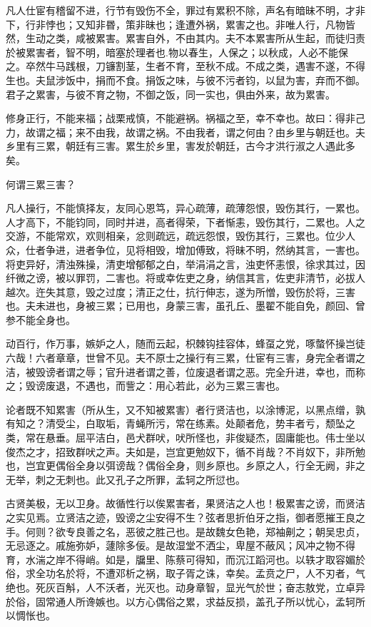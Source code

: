 \documentclass[]{article}
\begin{document}
凡人仕宦有稽留不进，行节有毁伤不全，罪过有累积不除，声名有暗昧不明，才非下，行非悖也；又知非昬，策非昧也；逢遭外祸，累害之也。非唯人行，凡物皆然，生动之类，咸被累害。累害自外，不由其内。夫不本累害所从生起，而徒归责於被累害者，智不明，暗塞於理者也.物以春生，人保之；以秋成，人必不能保之。卒然牛马践根，刀镰割茎，生者不育，至秋不成。不成之类，遇害不遂，不得生也。夫鼠涉饭中，捐而不食。捐饭之味，与彼不污者钧，以鼠为害，弃而不御。君子之累害，与彼不育之物，不御之饭，同一实也，俱由外来，故为累害。

修身正行，不能来福；战栗戒慎，不能避祸。祸福之至，幸不幸也。故曰：得非己力，故谓之福；来不由我，故谓之祸。不由我者，谓之何由？由乡里与朝廷也。夫乡里有三累，朝廷有三害。累生於乡里，害发於朝廷，古今才洪行淑之人遇此多矣。

何谓三累三害？

凡人操行，不能慎择友，友同心恩笃，异心疏薄，疏薄怨恨，毁伤其行，一累也。人才高下，不能钧同，同时并进，高者得荣，下者惭恚，毁伤其行，二累也。人之交游，不能常欢，欢则相亲，忿则疏远，疏远怨恨，毁伤其行，三累也。位少人众，仕者争进，进者争位，见将相毁，增加傅致，将昧不明，然纳其言，一害也。将吏异好，清浊殊操，清吏增郁郁之白，举涓涓之言，浊吏怀恚恨，徐求其过，因纤微之谤，被以罪罚，二害也。将或幸佐吏之身，纳信其言，佐吏非清节，必拔人越次。迕失其意，毁之过度；清正之仕，抗行伸志，遂为所憎，毁伤於将，三害也。夫未进也，身被三累；已用也，身蒙三害，虽孔丘、墨翟不能自免，颜回、曾参不能全身也。

动百行，作万事，嫉妒之人，随而云起，枳棘钩挂容体，蜂虿之党，啄螫怀操岂徒六哉！六者章章，世曾不见。夫不原士之操行有三累，仕宦有三害，身完全者谓之洁，被毁谤者谓之辱；官升进者谓之善，位废退者谓之恶。完全升进，幸也，而称之；毁谤废退，不遇也，而訾之：用心若此，必为三累三害也。

论者既不知累害（所从生，又不知被累害）者行贤洁也，以涂博泥，以黑点缯，孰有知之？清受尘，白取垢，青蝇所污，常在练素。处颠者危，势丰者亏，颓坠之类，常在悬垂。屈平洁白，邑犬群吠，吠所怪也，非俊疑杰，固庸能也。伟士坐以俊杰之才，招致群吠之声。夫如是，岂宜更勉奴下，循不肖哉？不肖奴下，非所勉也，岂宜更偶俗全身以弭谤哉？偶俗全身，则乡原也。乡原之人，行全无阙，非之无举，刺之无刺也。此又孔子之所罪，孟轲之所愆也。

古贤美极，无以卫身。故循性行以俟累害者，果贤洁之人也！极累害之谤，而贤洁之实见焉。立贤洁之迹，毁谤之尘安得不生？弦者思折伯牙之指，御者愿摧王良之手。何则？欲专良善之名，恶彼之胜己也。是故魏女色艳，郑袖劓之；朝吴忠贞，无忌逐之。戚施弥妒，蘧除多佞。是故湿堂不洒尘，卑屋不蔽风；风冲之物不得育，水湍之岸不得峭。如是，牖里、陈蔡可得知，而沉江蹈河也。以轶才取容媚於俗，求全功名於将，不遭邓析之祸，取子胥之诛，幸矣。孟贲之尸，人不刃者，气绝也。死灰百斛，人不沃者，光灭也。动身章智，显光气於世；奋志敖党，立卓异於俗，固常通人所谗嫉也。以方心偶俗之累，求益反损，盖孔子所以忧心，孟轲所以惆怅也。
\end{document}
